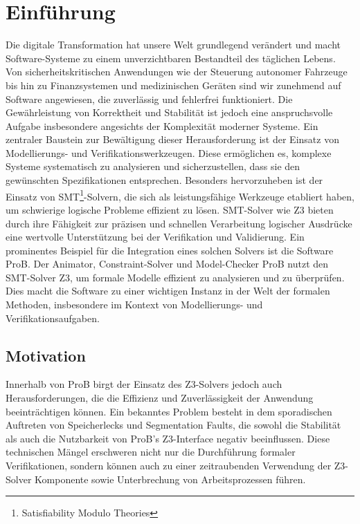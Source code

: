 


\section{Einführung}

Die digitale Transformation hat unsere Welt grundlegend verändert und macht Software-Systeme zu einem unverzichtbaren Bestandteil des täglichen Lebens.
Von sicherheitskritischen Anwendungen wie der Steuerung autonomer Fahrzeuge bis hin zu Finanzsystemen und medizinischen Geräten sind wir zunehmend auf Software angewiesen,
die zuverlässig und fehlerfrei funktioniert.
Die Gewährleistung von Korrektheit und Stabilität ist jedoch eine anspruchsvolle Aufgabe
insbesondere angesichts der Komplexität moderner Systeme.
Ein zentraler Baustein zur Bewältigung dieser Herausforderung ist der Einsatz von Modellierungs- und Verifikationswerkzeugen.
Diese ermöglichen es, komplexe Systeme systematisch zu analysieren und sicherzustellen,
dass sie den gewünschten Spezifikationen entsprechen.
Besonders hervorzuheben ist der Einsatz von SMT\footnote{Satisfiability Modulo Theories}-Solvern,
die sich als leistungsfähige Werkzeuge etabliert haben,
um schwierige logische Probleme effizient zu lösen.
SMT-Solver wie Z3 bieten durch ihre Fähigkeit zur präzisen und schnellen Verarbeitung logischer Ausdrücke eine wertvolle Unterstützung bei der Verifikation und Validierung.
Ein prominentes Beispiel für die Integration eines solchen Solvers ist die Software ProB.
Der Animator, Constraint-Solver und Model-Checker ProB nutzt den SMT-Solver Z3, um formale Modelle effizient zu analysieren und zu überprüfen.
Dies macht die Software zu einer wichtigen Instanz in der Welt der formalen Methoden,
insbesondere im Kontext von Modellierungs- und Verifikationsaufgaben.

\subsection{Motivation}

Innerhalb von ProB birgt der Einsatz des Z3-Solvers jedoch auch Herausforderungen, die die Effizienz und Zuverlässigkeit der Anwendung beeinträchtigen können.
Ein bekanntes Problem besteht in dem sporadischen Auftreten von Speicherlecks und Segmentation Faults,
die sowohl die Stabilität als auch die Nutzbarkeit von ProB's Z3-Interface negativ beeinflussen.
Diese technischen Mängel erschweren nicht nur die Durchführung formaler Verifikationen,
sondern können auch zu einer zeitraubenden Verwendung der Z3-Solver Komponente sowie Unterbrechung von Arbeitsprozessen führen.

